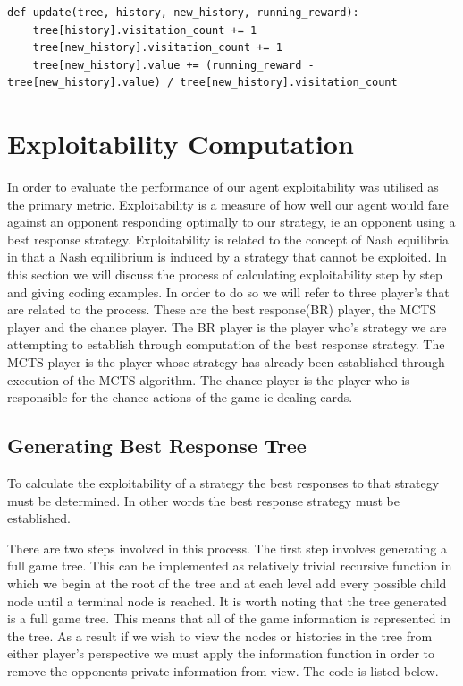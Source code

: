 \begin{lstlisting}[style=Python]
def update(tree, history, new_history, running_reward):
    tree[history].visitation_count += 1
    tree[new_history].visitation_count += 1
    tree[new_history].value += (running_reward - tree[new_history].value) / tree[new_history].visitation_count
\end{lstlisting}


\section{Exploitability Computation}\label{sec:bestResponseComputation}
In order to evaluate the performance of our agent exploitability was utilised as the primary metric.
Exploitability is a measure of how well our agent would fare against an opponent responding
optimally to our strategy, ie an opponent using a best response strategy.
Exploitability is related to the concept of Nash equilibria in that a Nash equilibrium
is induced by a strategy that cannot be exploited.
In this section we will discuss the process of calculating exploitability step by step and giving coding examples.
In order to do so we will refer to three player's that are related to the process.
These are the best response(BR) player, the MCTS player and the chance player.
The BR player is the player who's strategy we are attempting to establish through computation
of the best response strategy.
The MCTS player is the player whose strategy has already been established through execution of the MCTS algorithm.
The chance player is the player who is responsible for the chance actions of the game ie dealing cards.

\subsection{Generating Best Response Tree}\label{subsec:applyMCTS}
To calculate the exploitability of a strategy the best responses to that strategy must be
determined.
In other words the best response strategy must be established.

There are two steps involved in this process.
The first step involves generating a full game tree.
This can be implemented as relatively trivial recursive function in which we begin at the root of the
tree and at each level add every possible child node until a terminal node is reached.
It is worth noting that the tree generated is a full game tree.
This means that all of the game information is represented in the tree.
As a result if we wish to view the nodes or histories in the tree from either player's perspective we must apply
the information function in order to remove the opponents private information from view.
The code is listed below.

